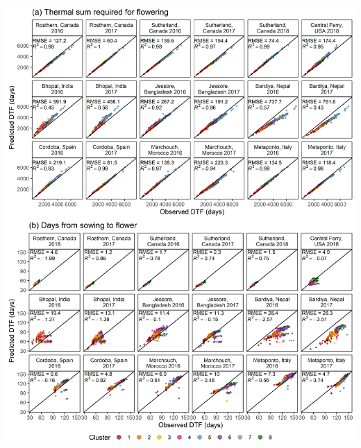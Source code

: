 \documentclass[
]{article}
\begin{document}
\includegraphics{Supplemental_Figure_10.png}
\end{document}
